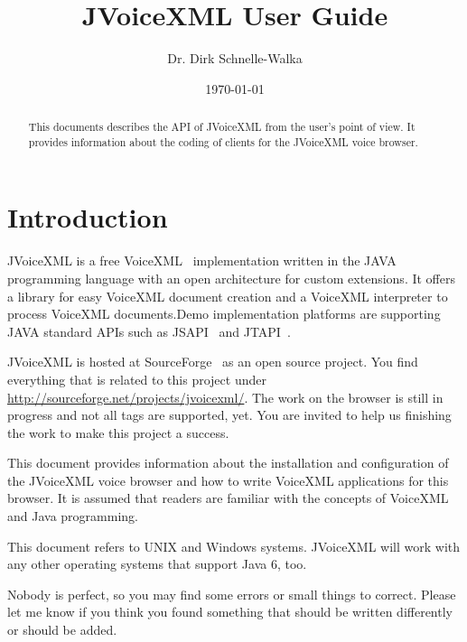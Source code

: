\documentclass[11pt,a4paper]{article}
\title{JVoiceXML \jvxmlversion User Guide}
\author{Dr. Dirk Schnelle-Walka}
\date{\today}
\begin{document}
\pagestyle{empty}

\maketitle

\pagestyle{headings}

\tableofcontents

\newpage

\begin{abstract}
This documents describes the API of JVoiceXML from the user's point of
view. It provides information about the coding of clients for
the JVoiceXML voice browser.
\end{abstract}


\section{Introduction}
\label{sec:introduction}

JVoiceXML is a free VoiceXML~\cite{w3.org:voicexml} implementation written in 
the JAVA programming language with an open architecture for custom
extensions. It offers a library for easy VoiceXML
document creation and a VoiceXML interpreter to process 
VoiceXML documents.Demo implementation platforms are supporting JAVA standard
APIs such as JSAPI~\cite{sun:jsapi} and JTAPI~\cite{sun:jsapi}.

JVoiceXML is hosted at SourceForge~\cite{sourceforge} as an open source project.
You find everything that is related to this project under
\url{http://sourceforge.net/projects/jvoicexml/}.
The work on the browser is still in progress and not all tags are
supported, yet. You are invited to help us finishing the work to make this
project a success.

This document provides information about the installation and
configuration of the JVoiceXML voice browser and how to write
VoiceXML applications for this browser.
It is assumed that readers are familiar with the concepts of
VoiceXML and Java programming.

This document refers to UNIX and Windows systems. JVoiceXML will work with 
any other operating systems that support Java 6, too.

Nobody is perfect, so you may find some errors or small things to correct.
Please let me know if you think you found something that should be written
differently or should be added.
\end{document}
